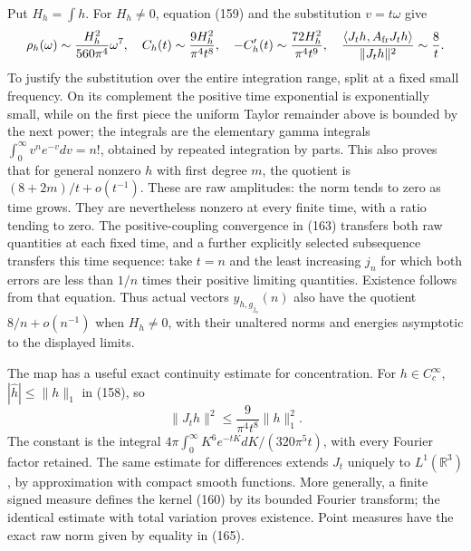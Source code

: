 \documentclass[11pt]{article}
\begin{document}
Put $H_h=\int h$. For $H_h\ne0$, equation
(159) and the substitution $v=t\omega$
give
\begin{equation}\label{eq:full-large-time}
 \rho_h(\omega)\sim\frac{H_h^2}{560\pi^4}\omega^7,
 \quad C_h(t)\sim\frac{9H_h^2}{\pi^4t^8},\quad
 -C_h'(t)\sim\frac{72H_h^2}{\pi^4t^9},\quad
 \frac{\langle J_th,A_{\rm fr}J_th\rangle}{\|J_th\|^2}
       \sim\frac8t.
\end{equation}
To justify the substitution over the entire integration range,
split at a fixed small frequency. On its complement the positive
time exponential is exponentially small, while on the first piece
the uniform Taylor remainder above is bounded by the next power;
the integrals are the elementary gamma integrals
$\int_0^\infty v^n e^{-v}dv=n!$, obtained by repeated integration
by parts. This also proves that for general nonzero $h$ with
first degree $m$, the quotient is $(8+2m)/t+o(t^{-1})$.
These are raw amplitudes: the norm tends to zero as time grows.
They are nevertheless nonzero at every finite time, with a ratio
tending to zero. The positive-coupling convergence in
(163) transfers both raw quantities at
each fixed time, and a further explicitly selected subsequence
transfers this time sequence: take $t=n$ and the least increasing
$j_n$ for which both errors are less than $1/n$ times their
positive limiting quantities. Existence follows from that equation.
Thus actual vectors $y_{h,g_{j_n}}(n)$ also have the quotient
$8/n+o(n^{-1})$ when $H_h\ne0$, with their unaltered norms and
energies asymptotic to the displayed limits.

The map has a useful exact continuity estimate for concentration.
For $h\in C_c^\infty$, $|\widehat h|\le\|h\|_1$ in
(158), so
\begin{equation}\label{eq:full-L1-bound}
 \|J_t h\|^2\le \frac{9}{\pi^4t^8}\|h\|_1^2.
\end{equation}
The constant is the integral
$4\pi\int_0^\infty K^6e^{-tK}dK/(320\pi^5t)$, with every
Fourier factor retained. The same estimate for differences extends
$J_t$ uniquely to $L^1(\mathbb R^3)$, by approximation with
compact smooth functions. More generally, a finite signed measure
defines the kernel (160) by its bounded Fourier
transform; the identical estimate with total variation proves
existence. Point measures have the exact raw norm given by equality
in (165).
\end{document}
